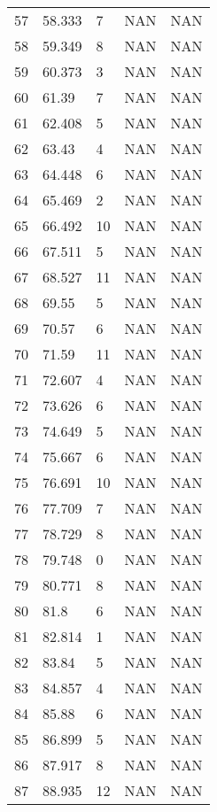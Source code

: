 \documentclass{article}
\begin{document}
\begin{longtable}{@{}lllll@{}}
				57  & 58.333  & 7     & NAN   & NAN   \\
				58  & 59.349  & 8     & NAN   & NAN   \\
				59  & 60.373  & 3     & NAN   & NAN   \\
				60  & 61.39   & 7     & NAN   & NAN   \\
				61  & 62.408  & 5     & NAN   & NAN   \\
				62  & 63.43   & 4     & NAN   & NAN   \\
				63  & 64.448  & 6     & NAN   & NAN   \\
				64  & 65.469  & 2     & NAN   & NAN   \\
				65  & 66.492  & 10    & NAN   & NAN   \\
				66  & 67.511  & 5     & NAN   & NAN   \\
				67  & 68.527  & 11    & NAN   & NAN   \\
				68  & 69.55   & 5     & NAN   & NAN   \\
				69  & 70.57   & 6     & NAN   & NAN   \\
				70  & 71.59   & 11    & NAN   & NAN   \\
				71  & 72.607  & 4     & NAN   & NAN   \\
				72  & 73.626  & 6     & NAN   & NAN   \\
				73  & 74.649  & 5     & NAN   & NAN   \\
				74  & 75.667  & 6     & NAN   & NAN   \\
				75  & 76.691  & 10    & NAN   & NAN   \\
				76  & 77.709  & 7     & NAN   & NAN   \\
				77  & 78.729  & 8     & NAN   & NAN   \\
				78  & 79.748  & 0     & NAN   & NAN   \\
				79  & 80.771  & 8     & NAN   & NAN   \\
				80  & 81.8    & 6     & NAN   & NAN   \\
				81  & 82.814  & 1     & NAN   & NAN   \\
				82  & 83.84   & 5     & NAN   & NAN   \\
				83  & 84.857  & 4     & NAN   & NAN   \\
				84  & 85.88   & 6     & NAN   & NAN   \\
				85  & 86.899  & 5     & NAN   & NAN   \\
				86  & 87.917  & 8     & NAN   & NAN   \\
				87  & 88.935  & 12    & NAN   & NAN   \\

\end{longtable}
\end{document}
